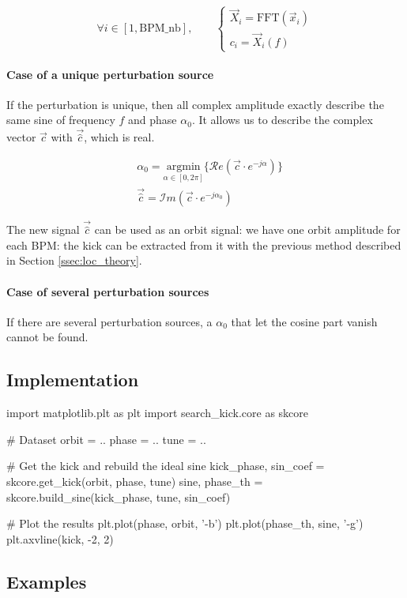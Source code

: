 \begin{equation}
\forall i \in [1, \mathrm{BPM\_nb}], \qquad 
\begin{cases}
\vec{X}_i = \mathrm{FFT}(\vec{x}_i) \\
c_i = \vec{X}_i(f)
\end{cases}
\end{equation}

\paragraph{Case of a unique perturbation source}

If the perturbation is unique, then all complex amplitude exactly describe the same sine of frequency $f$ and phase $\alpha_0$. It allows us to describe the complex vector $\vec{c}$ with $\vec{\hat{c}}$, which is real.

\begin{align}
&\alpha_0 = \underset{\alpha \in [0, 2\pi]}{\textrm{argmin}}\{\mathcal{R}e (\vec{c} \cdot e^{-j\alpha}) \} \\
&\vec{\hat{c}} = \mathcal{I}m (\vec{c} \cdot e^{-j\alpha_0})
\end{align}

The new signal $\vec{\hat{c}}$ can be used as an orbit signal: we have one orbit amplitude for each BPM: the kick can be extracted from it with the previous method described in Section \ref{ssec:loc_theory}.


\paragraph{Case of several perturbation sources}
If there are several perturbation sources, a $\alpha_0$ that let the cosine part vanish cannot be found. 


\subsection{Implementation}
\begin{python}[caption=Get the kick]
	import matplotlib.plt as plt
	import search_kick.core as skcore
	
	# Dataset
	orbit = ..
	phase = ..
	tune = ..
	
	# Get the kick and rebuild the ideal sine
	kick_phase, sin_coef = skcore.get_kick(orbit, phase, tune)
	sine, phase_th = skcore.build_sine(kick_phase, tune, sin_coef)
	
	# Plot the results
	plt.plot(phase, orbit, '-b')
	plt.plot(phase_th, sine, '-g')
	plt.axvline(kick, -2, 2)	
\end{python}


\subsection{Examples}


